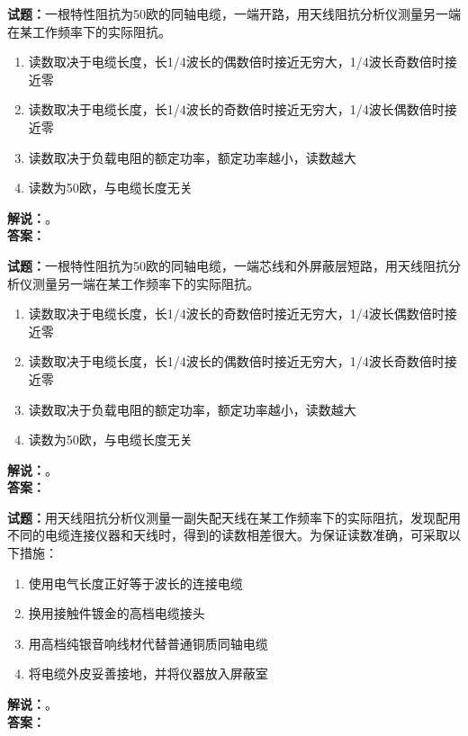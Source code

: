 \documentclass{ctexbook}
\begin{document}
\vspace{\baselineskip}

\noindent\textbf{试题：}一根特性阻抗为50欧的同轴电缆，一端开路，用天线阻抗分析仪测量另一端在某工作频率下的实际阻抗。
\begin{enumerate}[leftmargin=3em]
  \item 读数取决于电缆长度，长1/4波长的偶数倍时接近无穷大，1/4波长奇数倍时接近零
  \item 读数取决于电缆长度，长1/4波长的奇数倍时接近无穷大，1/4波长偶数倍时接近零
  \item 读数取决于负载电阻的额定功率，额定功率越小，读数越大
  \item 读数为50欧，与电缆长度无关
\end{enumerate}
\noindent\textbf{解说：}\textbf{}。\\\noindent\textbf{答案：}

\vspace{\baselineskip}

\noindent\textbf{试题：}一根特性阻抗为50欧的同轴电缆，一端芯线和外屏蔽层短路，用天线阻抗分析仪测量另一端在某工作频率下的实际阻抗。
\begin{enumerate}[leftmargin=3em]
  \item 读数取决于电缆长度，长1/4波长的奇数倍时接近无穷大，1/4波长偶数倍时接近零
  \item 读数取决于电缆长度，长1/4波长的偶数倍时接近无穷大，1/4波长奇数倍时接近零
  \item 读数取决于负载电阻的额定功率，额定功率越小，读数越大
  \item 读数为50欧，与电缆长度无关
\end{enumerate}
\noindent\textbf{解说：}\textbf{}。\\\noindent\textbf{答案：}

\vspace{\baselineskip}

\noindent\textbf{试题：}用天线阻抗分析仪测量一副失配天线在某工作频率下的实际阻抗，发现配用不同的电缆连接仪器和天线时，得到的读数相差很大。为保证读数准确，可采取以下措施：
\begin{enumerate}[leftmargin=3em]
  \item 使用电气长度正好等于波长的连接电缆
  \item 换用接触件镀金的高档电缆接头
  \item 用高档纯银音响线材代替普通铜质同轴电缆
  \item 将电缆外皮妥善接地，并将仪器放入屏蔽室
\end{enumerate}
\noindent\textbf{解说：}\textbf{}。\\\noindent\textbf{答案：}
\end{document}

